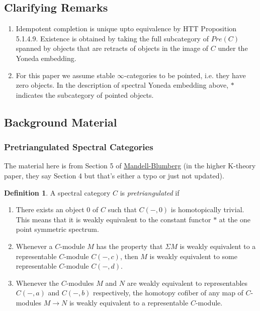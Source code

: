 \documentclass[letterpaper]{article}
\theoremstyle{definition}
\newtheorem{definition}[lemma]{Definition}
\begin{document}
\subsection{Clarifying Remarks}

\begin{enumerate}
\item Idempotent completion is unique upto equivalence by HTT Proposition 5.1.4.9. Existence is obtained by taking the full subcategory of $Pre(C)$ spanned by objects that are retracts of objects in the image of $C$ under the Yoneda embedding.
\item For this paper we assume stable $\infty$-categories to be pointed, i.e. they have zero objects. In the description of spectral Yoneda embedding above, $*$ indicates the subcategory of pointed objects.
\end{enumerate}

\subsection{Background Material}

\subsubsection{Pretriangulated Spectral Categories}

The material here is from Section 5 of \href{References/LocalizationTHH.pdf}{Mandell-Blumberg} (in the higher K-theory paper, they say Section 4 but that's either a typo or just not updated).

\begin{definition}
A spectral category $C$ is \textit{pretriangulated} if
\begin{enumerate}
\item There exists an object 0 of $C$ such that $C(-,0)$ is homotopically trivial. This means that it is weakly equivalent to the constant functor $*$ at the one point symmetric spectrum.
\item Whenever a $C$-module $M$ has the property that $\Sigma M$ is weakly equivalent to a representable $C$-module $C(-,c)$, then $M$ is weakly equivalent to some representable $C$-module $C(-,d)$.
\item Whenever the $C$-modules $M$ and $N$ are weakly equivalent to representables $C(-,a)$ and $C(-,b)$ respectively, the homotopy cofiber of any map of $C$-modules $M \rightarrow N$ is weakly equivalent to a representable $C$-module.
\end{enumerate}
\end{definition}
\end{document}
